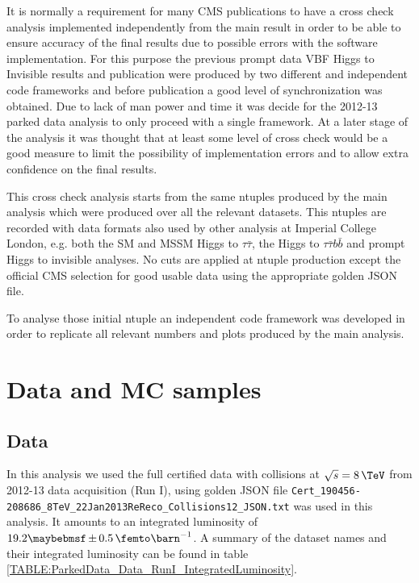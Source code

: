 It is normally a requirement for many CMS publications to have a cross check analysis implemented independently from the main result in order to be able to ensure accuracy of the final results due to possible errors with the software implementation. For this purpose the previous prompt data \gls{VBF} Higgs to Invisible results and publication were produced by two different and independent code frameworks and before publication a good level of synchronization was obtained. Due to lack of man power and time it was decide for the 2012-13 parked data analysis to only proceed with a single framework. At a later stage of the analysis it was thought that at least some level of cross check would be a good measure to limit the possibility of implementation errors and to allow extra confidence on the final results.
 
This cross check analysis starts from the same ntuples produced by the main analysis which were produced over all the relevant datasets. This ntuples are recorded with data formats also used by other analysis at Imperial College London, e.g. both the \gls{SM} and \gls{MSSM} Higgs to $\tau\bar{\tau}$, the Higgs to $\tau\bar{\tau}b\bar{b}$ and prompt Higgs to invisible analyses. No cuts are applied at ntuple production except the official \gls{CMS} selection for good usable data using the appropriate golden \gls{JSON} file.
 
To analyse those initial ntuple an independent code framework was developed in order to replicate all relevant numbers and plots produced by the main analysis.

\section{Data and MC samples}

\subsection{Data}

In this analysis we used the full certified data with collisions at $\sqrt{s}=8\,\TeV$ from 2012-13 data acquisition (Run I), using golden JSON file \verb|Cert_190456-208686_8TeV_22Jan2013ReReco_Collisions12_JSON.txt| was used in this analysis. It amounts to an integrated luminosity of $19.2 \pm 0.5 \,\femto\barn^{-1}$. A summary of the dataset names and their integrated luminosity can be found in table \ref{TABLE:ParkedData_Data_RunI_IntegratedLuminosity}.

